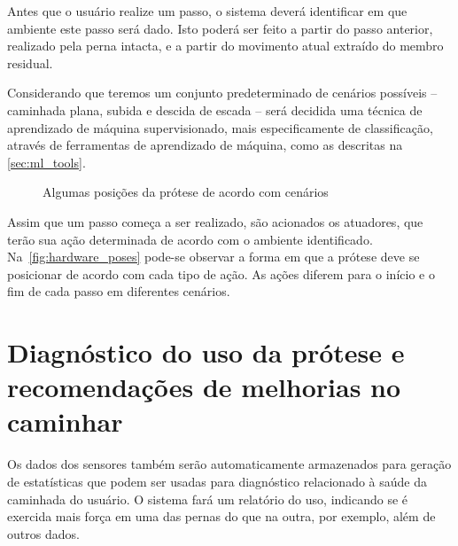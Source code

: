 Antes que o usuário realize um passo, o sistema deverá identificar em que ambiente este passo será dado. Isto poderá ser feito a partir do passo anterior, realizado pela perna intacta, e a partir do movimento atual extraído do membro residual.

Considerando que teremos um conjunto predeterminado de cenários possíveis -- caminhada plana, subida e descida de escada -- será decidida uma técnica de aprendizado de máquina supervisionado, mais especificamente de classificação, através de ferramentas de aprendizado de máquina, como as descritas na \autoref{sec:ml_tools}.

\begin{figure}[h]
	\caption{\label{fig:hardware_poses}Algumas posições da prótese de acordo com cenários}
	\begin{center}
	\end{center}
\end{figure}

Assim que um passo começa a ser realizado, são acionados os atuadores, que terão sua ação determinada de acordo com o ambiente identificado. Na~\autoref{fig:hardware_poses} pode-se observar a forma em que a prótese deve se posicionar de acordo com cada tipo de ação. As ações diferem para o início e o fim de cada passo em diferentes cenários. 

\section{Diagnóstico do uso da prótese e recomendações de melhorias no caminhar}
Os dados dos sensores também serão automaticamente armazenados para geração de estatísticas que podem ser usadas para diagnóstico relacionado à saúde da caminhada do usuário. O sistema fará um relatório do uso, indicando se é exercida mais força em uma das pernas do que na outra, por exemplo, além de outros dados.

